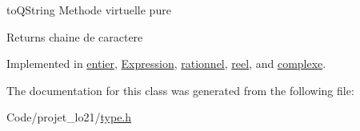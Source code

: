 to\-Q\-String Methode virtuelle pure 

\begin{DoxyReturn}{Returns}
chaine de caractere 
\end{DoxyReturn}


Implemented in \hyperlink{classentier_a47b7c0d899f24e9117e123165648686b}{entier}, \hyperlink{class_expression_a4404792ff4997e7c06a3242062825f5c}{Expression}, \hyperlink{classrationnel_a6c905c688ae54647074a5ddf3ef648bd}{rationnel}, \hyperlink{classreel_a6b06a283958b63fde5c12382b744a8c9}{reel}, and \hyperlink{classcomplexe_a5fc10d08facdcbd833d91d0c765c9c18}{complexe}.



The documentation for this class was generated from the following file\-:\begin{DoxyCompactItemize}
\item 
Code/projet\-\_\-lo21/\hyperlink{type_8h}{type.\-h}\end{DoxyCompactItemize}
